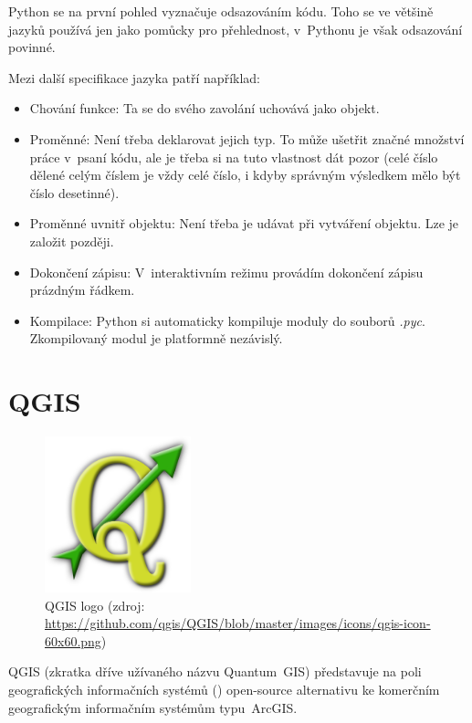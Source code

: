 Python se na první pohled vyznačuje odsazováním kódu. Toho se ve většině jazyků používá jen jako
pomůcky pro přehlednost, v~Pythonu je však odsazování povinné. 

Mezi další specifikace jazyka patří například: 
\begin{itemize}

	\item Chování funkce: Ta se do svého zavolání uchovává jako objekt. 
	
	\item Proměnné: Není třeba deklarovat jejich typ. To může ušetřit značné množství práce
	v~psaní kódu, ale je třeba si na tuto vlastnost dát pozor (celé číslo dělené celým číslem je
	vždy celé číslo, i kdyby správným výsledkem mělo být číslo desetinné). 
	
	\item Proměnné uvnitř objektu: Není třeba je udávat při vytváření objektu. Lze je založit později. 
	
	\item Dokončení zápisu: V~interaktivním režimu provádím dokončení zápisu prázdným řádkem. 
	
	\item Kompilace: Python si automaticky kompiluje moduly do souborů \textit{.pyc}. Zkompilovaný
	modul je platformně nezávislý. 

\end{itemize}


\section{QGIS}
\label{qgis}

  \begin{figure}[H]
    \centering
      \includegraphics[width=120pt]{./pictures/qgis.png}
      \caption[QGIS logo]{QGIS logo 
      (zdroj: \url{https://github.com/qgis/QGIS/blob/master/images/icons/qgis-icon-60x60.png})}
      \label{fig:qgis}
  \end{figure}

QGIS (zkratka dříve užívaného názvu Quantum~GIS) představuje na poli geogra\-fic\-kých informačních systémů () open-source alternativu ke komerčním geografickým informačním systémům typu~ArcGIS. 

